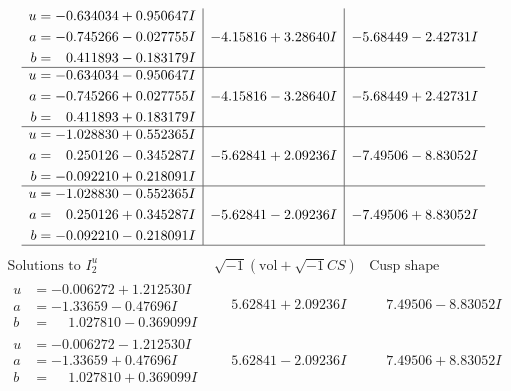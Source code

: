 \documentclass[1p]{elsarticle_modified}
\theoremstyle{definition}
\newcommand{\I}{\sqrt{-1}}
\begin{document}
$$\begin{array}{c|c|c}
\begin{aligned}
u &= -0.634034 + 0.950647 I \\
a &= -0.745266 - 0.027755 I \\
b &= \phantom{-}0.411893 - 0.183179 I\end{aligned}
 & -4.15816 + 3.28640 I & -5.68449 - 2.42731 I \\ \hline\begin{aligned}
u &= -0.634034 - 0.950647 I \\
a &= -0.745266 + 0.027755 I \\
b &= \phantom{-}0.411893 + 0.183179 I\end{aligned}
 & -4.15816 - 3.28640 I & -5.68449 + 2.42731 I \\ \hline\begin{aligned}
u &= -1.028830 + 0.552365 I \\
a &= \phantom{-}0.250126 - 0.345287 I \\
b &= -0.092210 + 0.218091 I\end{aligned}
 & -5.62841 + 2.09236 I & -7.49506 - 8.83052 I \\ \hline\begin{aligned}
u &= -1.028830 - 0.552365 I \\
a &= \phantom{-}0.250126 + 0.345287 I \\
b &= -0.092210 - 0.218091 I\end{aligned}
 & -5.62841 - 2.09236 I & -7.49506 + 8.83052 I\\
 \hline 
 \end{array}$$\newpage$$\begin{array}{c|c|c}  
\text{Solutions to }I^u_{2}& \I (\text{vol} + \sqrt{-1}CS) & \text{Cusp shape}\\
 \hline 
\begin{aligned}
u &= -0.006272 + 1.212530 I \\
a &= -1.33659 - 0.47696 I \\
b &= \phantom{-}1.027810 - 0.369099 I\end{aligned}
 & \phantom{-}5.62841 + 2.09236 I & \phantom{-}7.49506 - 8.83052 I \\ \hline\begin{aligned}
u &= -0.006272 - 1.212530 I \\
a &= -1.33659 + 0.47696 I \\
b &= \phantom{-}1.027810 + 0.369099 I\end{aligned}
 & \phantom{-}5.62841 - 2.09236 I & \phantom{-}7.49506 + 8.83052 I \\ \hline\begin{aligned}

\end{aligned}
\end{array}$$
\end{document}
